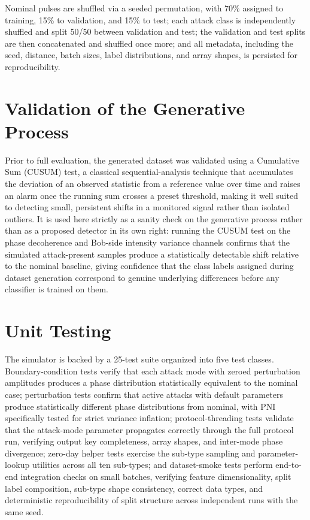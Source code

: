 \documentclass[12pt, a4paper]{report}
\begin{document}
Nominal pulses are shuffled via a seeded permutation, with 70\% assigned to training, 15\% to validation, and 15\% to test; each attack class is independently shuffled and split 50/50 between validation and test; the validation and test splits are then concatenated and shuffled once more; and all metadata, including the seed, distance, batch sizes, label distributions, and array shapes, is persisted for reproducibility.

\section{Validation of the Generative Process}
Prior to full evaluation, the generated dataset was validated using a Cumulative Sum (CUSUM) test, a classical sequential-analysis technique that accumulates the deviation of an observed statistic from a reference value over time and raises an alarm once the running sum crosses a preset threshold, making it well suited to detecting small, persistent shifts in a monitored signal rather than isolated outliers. It is used here strictly as a sanity check on the generative process rather than as a proposed detector in its own right: running the CUSUM test on the phase decoherence and Bob-side intensity variance channels confirms that the simulated attack-present samples produce a statistically detectable shift relative to the nominal baseline, giving confidence that the class labels assigned during dataset generation correspond to genuine underlying differences before any classifier is trained on them.

\section{Unit Testing}
The simulator is backed by a 25-test suite organized into five test classes. Boundary-condition tests verify that each attack mode with zeroed perturbation amplitudes produces a phase distribution statistically equivalent to the nominal case; perturbation tests confirm that active attacks with default parameters produce statistically different phase distributions from nominal, with PNI specifically tested for strict variance inflation; protocol-threading tests validate that the attack-mode parameter propagates correctly through the full protocol run, verifying output key completeness, array shapes, and inter-mode phase divergence; zero-day helper tests exercise the sub-type sampling and parameter-lookup utilities across all ten sub-types; and dataset-smoke tests perform end-to-end integration checks on small batches, verifying feature dimensionality, split label composition, sub-type shape consistency, correct data types, and deterministic reproducibility of split structure across independent runs with the same seed.
\end{document}
